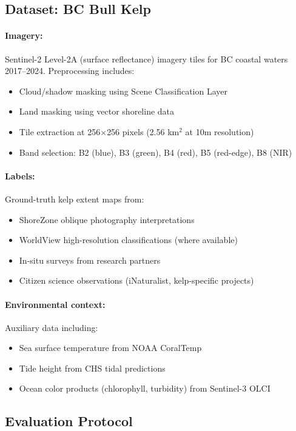 \documentclass[12pt,oneside]{book}
\begin{document}
\subsection{Dataset: BC Bull Kelp}
\label{subsec:dataset}

\paragraph{Imagery:} Sentinel-2 Level-2A (surface reflectance) imagery tiles for BC coastal waters 2017--2024. Preprocessing includes:
\begin{itemize}
    \item Cloud/shadow masking using Scene Classification Layer
    \item Land masking using vector shoreline data
    \item Tile extraction at 256$\times$256 pixels (2.56 km$^2$ at 10m resolution)
    \item Band selection: B2 (blue), B3 (green), B4 (red), B5 (red-edge), B8 (NIR)
\end{itemize}

\paragraph{Labels:} Ground-truth kelp extent maps from:
\begin{itemize}
    \item ShoreZone oblique photography interpretations
    \item WorldView high-resolution classifications (where available)
    \item In-situ surveys from research partners
    \item Citizen science observations (iNaturalist, kelp-specific projects)
\end{itemize}

\paragraph{Environmental context:} Auxiliary data including:
\begin{itemize}
    \item Sea surface temperature from NOAA CoralTemp
    \item Tide height from CHS tidal predictions
    \item Ocean color products (chlorophyll, turbidity) from Sentinel-3 OLCI
\end{itemize}

\subsection{Evaluation Protocol}
\label{subsec:eval-protocol}
\end{document}
